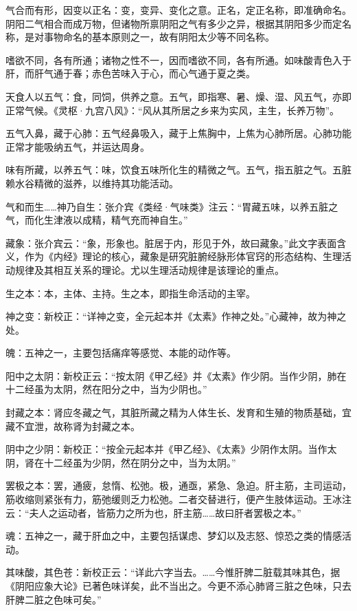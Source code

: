 \documentclass[12pt]{ctexbook}
\begin{document}
\begin{jiaozhu}
	\item 气合而有形，因变以正名：变，变异、变化之意。正名，定正名称，即准确命名。阴阳二气相合而成万物，但诸物所禀阴阳之气有多少之异，根据其阴阳多少而定名称，是对事物命名的基本原则之一，故有阴阳太少等不同名称。
	\item 嗜欲不同，各有所通；诸物之性不一，因而嗜欲不同，各有所通。如味酸青色入于肝，而肝气通于春；赤色苦味入于心，而心气通于夏之类。
	\item 天食人以五气：食，同饲，供养之意。五气，即指寒、暑、燥、湿、风五气，亦即正常气候。《灵枢·九宫八风》：“风从其所居之乡来为实风，主生，长养万物”。
	\item 五气入鼻，藏于心肺：五气经鼻吸入，藏于上焦胸中，上焦为心肺所居。心肺功能正常才能吸纳五气，并运达周身。
	\item 味有所藏，以养五气：味，饮食五味所化生的精微之气。五气，指五脏之气。五脏赖水谷精微的滋养，以维持其功能活动。
	\item 气和而生……神乃自生：张介宾《类经·气味类》注云：“胃藏五味，以养五脏之气，而化生津液以成精，精气充而神自生。”
	\item 藏象：张介宾云：“象，形象也。脏居于内，形见于外，故曰藏象。”此文字表面含义，作为《内经》理论的核心，藏象是研究脏腑经脉形体官窍的形态结构、生理活动规律及其相互关系的理论。尤以生理活动规律是该理论的重点。
	\item 生之本：本，主体、主持。生之本，即指生命活动的主宰。
	\item 神之变：新校正：“详神之变，全元起本并《太素》作神之处。”心藏神，故为神之处。
	\item 魄：五神之一，主要包括痛痒等感觉、本能的动作等。
	\item 阳中之太阴：新校正云：“按太阴《甲乙经》并《太素》作少阴。当作少阴，肺在十二经虽为太阴，然在阳分之中，当为少阴也。”
	\item 封藏之本：肾应冬藏之气，其脏所藏之精为人体生长、发育和生殖的物质基础，宜藏不宜泄，故称肾为封藏之本。
	\item 阴中之少阴：新校正：“按全元起本并《甲乙经》、《太素》少阴作太阴。当作太阴，肾在十二经虽为少阴，然在阴分之中，当为太阴。”
	\item 罢极之本：罢，通疲，怠惰、松弛。极，通亟，紧急、急迫。肝主筋，主司运动，筋收缩则紧张有力，筋弛缓则乏力松弛。二者交替进行，便产生肢体运动。王冰注云：“夫人之运动者，皆筋力之所为也，肝主筋……故曰肝者罢极之本。”
	\item 魂：五神之一，藏于肝血之中，主要包括谋虑、梦幻以及志怒、惊恐之类的情感活动。
	\item 其味酸，其色苍：新校正云：“详此六字当去。……今惟肝脾二脏载其味其色，据《阴阳应象大论》已著色味详矣，此不当出之。今更不添心肺肾三脏之色味，只去肝脾二脏之色味可矣。”

\end{jiaozhu}
\end{document}
